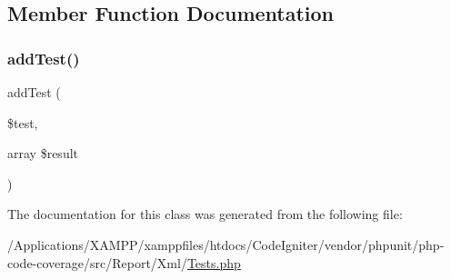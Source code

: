 \subsection{Member Function Documentation}
\mbox{\label{class_sebastian_bergmann_1_1_code_coverage_1_1_report_1_1_xml_1_1_tests_a70985211a57ffa53b9d4c50b98fc70cc}} 
\subsubsection{\texorpdfstring{add\+Test()}{addTest()}}
{\footnotesize\ttfamily add\+Test (\begin{DoxyParamCaption}\item[{}]{\$test,  }\item[{array}]{\$result }\end{DoxyParamCaption})}



The documentation for this class was generated from the following file\+:\begin{DoxyCompactItemize}
\item 
/\+Applications/\+X\+A\+M\+P\+P/xamppfiles/htdocs/\+Code\+Igniter/vendor/phpunit/php-\/code-\/coverage/src/\+Report/\+Xml/\mbox{\hyperlink{_tests_8php}{Tests.\+php}}\end{DoxyCompactItemize}
